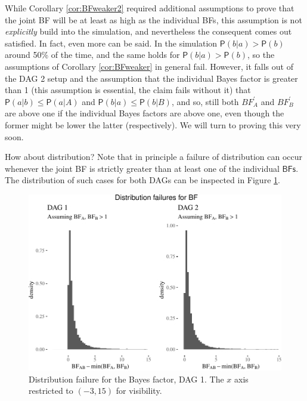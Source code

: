 \documentclass[
  10pt,
  dvipsnames,enabledeprecatedfontcommands]{scrartcl}
\newcommand{\pr}[1]{\ensuremath{\mathsf{P}(#1)}}
\begin{document}
While Corollary \ref{cor:BFweaker2} required additional assumptions to
prove that the joint \textsf{BF} will be at least as high as the
individual \textsf{BFs}, this assumption is not \emph{explicitly} build
into the simulation, and nevertheless the consequent comes out
satisfied. In fact, even more can be said. In the simulation
\(\pr{b \vert a}> \pr{b}\) around 50\% of the time, and the same holds
for \(\pr{b \vert a}> \pr{b}\), so the assumptions of Corollary
\ref{cor:BFweaker} in general fail. However, it falls out of the
\textsf{DAG 2} setup and the assumption that the individual Bayes factor
is greater than 1 (this assumption is essential, the claim fails without
it) that \(\pr{a \vert b} \leq \pr{a \vert A}\) and
\(\pr{b \vert a} \leq \pr{b \vert B}\), and so, still both
\(BF^{'}_{A}\) and \(BF^{'}_{B}\) are above one if the individual Bayes
factors are above one, even though the former might be lower the latter
(respectively). We will turn to proving this very soon.

How about distribution? Note that in principle a failure of distribution
can occur whenever the joint \textsf{BF} is strictly greater than at
least one of the individual \(\textsf{BFs}\). The distribution of such
cases for both DAGs can be inspected in Figure \ref{fig:BFdistr}.

\vspace{1mm}
\footnotesize

\normalsize

\begin{figure}

\begin{center}\includegraphics[width=1\linewidth]{conjunction-appendix13_files/figure-latex/plotBFDistr-1} \end{center}
\caption{Distribution failure for the Bayes factor, \textsf{DAG 1}. The $x$ axis restricted to $(-3,15)$ for visibility.}
\label{fig:BFdistr}
\end{figure}
\end{document}
